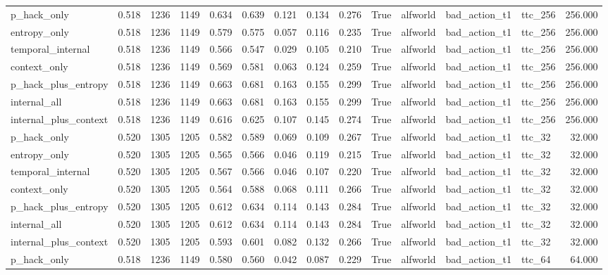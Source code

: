 \begin{tabular}{lrrrrrrrrrlllr}
p_hack_only & 0.518 & 1236 & 1149 & 0.634 & 0.639 & 0.121 & 0.134 & 0.276 & True & alfworld & bad_action_t1 & ttc_256 & 256.000 \\
entropy_only & 0.518 & 1236 & 1149 & 0.579 & 0.575 & 0.057 & 0.116 & 0.235 & True & alfworld & bad_action_t1 & ttc_256 & 256.000 \\
temporal_internal & 0.518 & 1236 & 1149 & 0.566 & 0.547 & 0.029 & 0.105 & 0.210 & True & alfworld & bad_action_t1 & ttc_256 & 256.000 \\
context_only & 0.518 & 1236 & 1149 & 0.569 & 0.581 & 0.063 & 0.124 & 0.259 & True & alfworld & bad_action_t1 & ttc_256 & 256.000 \\
p_hack_plus_entropy & 0.518 & 1236 & 1149 & 0.663 & 0.681 & 0.163 & 0.155 & 0.299 & True & alfworld & bad_action_t1 & ttc_256 & 256.000 \\
internal_all & 0.518 & 1236 & 1149 & 0.663 & 0.681 & 0.163 & 0.155 & 0.299 & True & alfworld & bad_action_t1 & ttc_256 & 256.000 \\
internal_plus_context & 0.518 & 1236 & 1149 & 0.616 & 0.625 & 0.107 & 0.145 & 0.274 & True & alfworld & bad_action_t1 & ttc_256 & 256.000 \\
p_hack_only & 0.520 & 1305 & 1205 & 0.582 & 0.589 & 0.069 & 0.109 & 0.267 & True & alfworld & bad_action_t1 & ttc_32 & 32.000 \\
entropy_only & 0.520 & 1305 & 1205 & 0.565 & 0.566 & 0.046 & 0.119 & 0.215 & True & alfworld & bad_action_t1 & ttc_32 & 32.000 \\
temporal_internal & 0.520 & 1305 & 1205 & 0.567 & 0.566 & 0.046 & 0.107 & 0.220 & True & alfworld & bad_action_t1 & ttc_32 & 32.000 \\
context_only & 0.520 & 1305 & 1205 & 0.564 & 0.588 & 0.068 & 0.111 & 0.266 & True & alfworld & bad_action_t1 & ttc_32 & 32.000 \\
p_hack_plus_entropy & 0.520 & 1305 & 1205 & 0.612 & 0.634 & 0.114 & 0.143 & 0.284 & True & alfworld & bad_action_t1 & ttc_32 & 32.000 \\
internal_all & 0.520 & 1305 & 1205 & 0.612 & 0.634 & 0.114 & 0.143 & 0.284 & True & alfworld & bad_action_t1 & ttc_32 & 32.000 \\
internal_plus_context & 0.520 & 1305 & 1205 & 0.593 & 0.601 & 0.082 & 0.132 & 0.266 & True & alfworld & bad_action_t1 & ttc_32 & 32.000 \\
p_hack_only & 0.518 & 1236 & 1149 & 0.580 & 0.560 & 0.042 & 0.087 & 0.229 & True & alfworld & bad_action_t1 & ttc_64 & 64.000 \\

\end{tabular}

